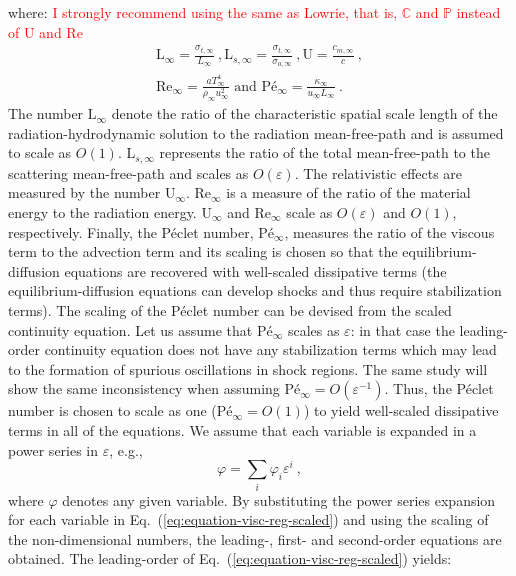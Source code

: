 \documentclass[review]{elsarticle}
\newcommand{\eqt}[1]{Eq.~(\ref{#1})}                     %
\renewcommand{\Re}{\textrm{Re}}
\newcommand{\Us}{\textrm{U}}
\newcommand{\Ls}{\textrm{L}}
\newcommand{\Pe}{\textrm{P\'e}}
\newcommand{\tcr}[1]{\textcolor{red}{#1}}
\begin{document}
%
where: \tcr{I strongly recommend using the same as Lowrie, that is, $\mathbb{C}$ and $\mathbb{P}$ instead of $\Us$ and $\Re$}
%
\begin{multline}\label{eq:scaled-nb}
\Ls_\infty = \frac{\sigma_{t,\infty}}{L_\infty} \ , 
\Ls_{s,\infty} = \frac{\sigma_{t,\infty}}{\sigma_{a,\infty}} \ , 
\Us = \frac{c_{m,\infty}}{c} \ , \\  
\Re_\infty = \frac{a T^4_\infty}{\rho_\infty u^2_\infty} 
\text{ and } \Pe_\infty = \frac{\kappa_\infty}{u_\infty L_\infty} \ .
\end{multline}
%
The number $\Ls_\infty$ denote the ratio of the characteristic spatial scale length of the radiation-hydrodynamic solution to the radiation mean-free-path and is assumed to scale as $O(1)$. 
$\Ls_{s,\infty}$ represents the ratio of the total mean-free-path to the scattering mean-free-path and scales as $O(\varepsilon)$. 
The relativistic effects are measured by the number $\Us_\infty$.
$\Re_\infty$ is a measure of the ratio of the material energy to the radiation energy. $\Us_\infty$ and $\Re_\infty$ scale as $O(\varepsilon)$ and $O(1)$, respectively. Finally, the P\' eclet number, $\Pe_\infty$, measures the ratio of the viscous term to the advection term and its scaling is chosen so that the equilibrium-diffusion equations are recovered with well-scaled dissipative terms (the equilibrium-diffusion equations can develop shocks and thus require stabilization terms). The scaling of the P\'eclet number can be devised from the scaled continuity equation. Let us assume that $\Pe_\infty$ scales as $\varepsilon$: in that case the leading-order continuity equation does not have any stabilization terms which may lead to the formation of spurious oscillations in shock regions. The same study will show the same inconsistency when assuming $\Pe_\infty = O(\varepsilon^{-1})$. Thus, the P\'eclet number is chosen to scale as one ($\Pe_\infty = O(1)$) to yield well-scaled dissipative terms in all of the equations. We assume that each variable is expanded in a power series in $\varepsilon$, e.g.,
%
\begin{equation}\label{eq:expansion-series}
\varphi = \sum_i \varphi_i \varepsilon^i \ ,
\end{equation}
%
where $\varphi$ denotes any given variable. By substituting the power series expansion for each variable in \eqt{eq:equation-visc-reg-scaled} and using the scaling of the non-dimensional numbers, the leading-, first- and second-order equations are obtained. The leading-order of \eqt{eq:equation-visc-reg-scaled} yields:
\end{document}
